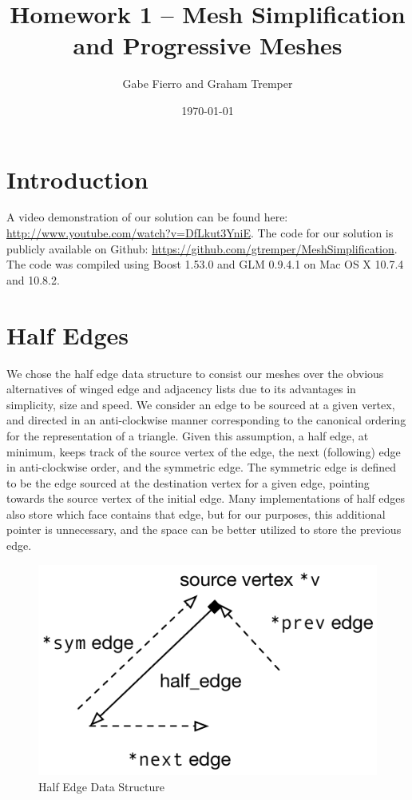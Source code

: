 \documentclass[11pt]{article}
\begin{document}
\title{Homework 1 -- Mesh Simplification and Progressive Meshes}
\author{Gabe Fierro and Graham Tremper}
\date{\today}
\maketitle

\section{Introduction}

A video demonstration of our solution can be found here:
\href{http://www.youtube.com/watch?v=DfLkut3YniE}{http://www.youtube.com/watch?v=DfLkut3YniE}.
The code for our solution is publicly available on Github:
\href{https://github.com/gtremper/MeshSimplification}{https://github.com/gtremper/MeshSimplification}.
The code was compiled using Boost 1.53.0 and GLM 0.9.4.1 on Mac OS X 10.7.4 and
10.8.2.

\section{Half Edges}

We chose the half edge data structure to consist our meshes over the obvious
alternatives of winged edge and adjacency lists due to its advantages in
simplicity, size and speed. We consider an edge to be sourced at a given
vertex, and directed in an anti-clockwise manner corresponding to the canonical
ordering for the representation of a triangle. Given this assumption, a half
edge, at minimum, keeps track of the source vertex of the edge, the next
(following) edge in anti-clockwise order, and the symmetric edge. The symmetric
edge is defined to be the edge sourced at the destination vertex for a given
edge, pointing towards the source vertex of the initial edge. Many
implementations of half edges also store which face contains that edge, but for
our purposes, this additional pointer is unnecessary, and the space can be
better utilized to store the previous edge.

\begin{figure}[htb]
\begin{center}
  \includegraphics{figs/half_edge-data-structure}
\end{center}
\caption{Half Edge Data Structure}
\end{figure}
\end{document}
